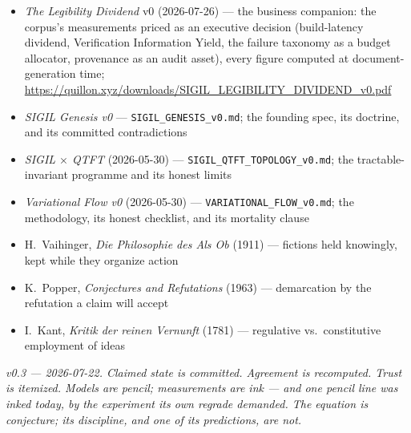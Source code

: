 \documentclass[10pt,a4paper]{article}
\begin{document}
\begin{itemize}[leftmargin=1.2em,itemsep=1pt]
two-axis grading applied arc by arc to the whole measured record, including the regrade
of the delivery law and the chapter on instruments that lied;
\url{https://quillon.xyz/downloads/SIGIL_MEASUREMENT_BOOK_v0.pdf}
\item \emph{The Legibility Dividend} v0 (2026-07-26) — the business companion: the corpus's
measurements priced as an executive decision (build-latency dividend, Verification Information
Yield, the failure taxonomy as a budget allocator, provenance as an audit asset), every figure
computed at document-generation time;
\url{https://quillon.xyz/downloads/SIGIL_LEGIBILITY_DIVIDEND_v0.pdf}
\item \emph{SIGIL Genesis v0} — \texttt{SIGIL\_GENESIS\_v0.md}; the founding
spec, its doctrine, and its committed contradictions
\item \emph{SIGIL $\times$ QTFT} (2026-05-30) — \texttt{SIGIL\_QTFT\_TOPOLOGY\_v0.md};
the tractable-invariant programme and its honest limits
\item \emph{Variational Flow v0} (2026-05-30) —
\texttt{VARIATIONAL\_FLOW\_v0.md}; the methodology, its honest checklist, and its
mortality clause
\item H.~Vaihinger, \emph{Die Philosophie des Als Ob} (1911) — fictions held
knowingly, kept while they organize action
\item K.~Popper, \emph{Conjectures and Refutations} (1963) — demarcation by the
refutation a claim will accept
\item I.~Kant, \emph{Kritik der reinen Vernunft} (1781) — regulative vs.\
constitutive employment of ideas
\end{itemize}

\vspace{0.8em}
\noindent\textit{v0.3 — 2026-07-22. Claimed state is committed. Agreement is
recomputed. Trust is itemized. Models are pencil; measurements are ink — and one
pencil line was inked today, by the experiment its own regrade demanded. The
equation is conjecture; its discipline, and one of its predictions, are not.}
\end{document}
